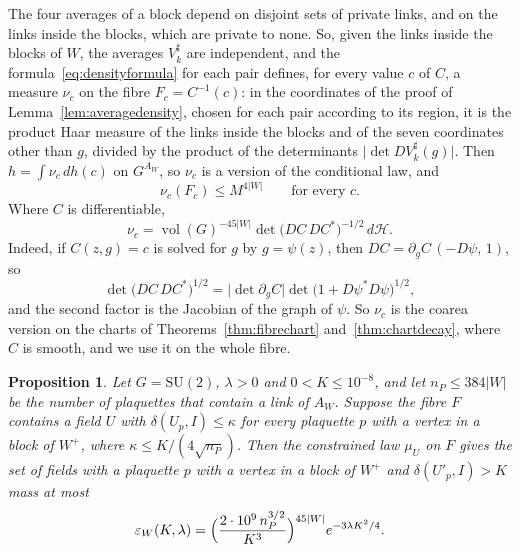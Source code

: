 \documentclass[11pt]{amsart}
\newtheorem{proposition}[theorem]{Proposition}
\theoremstyle{definition}
\theoremstyle{remark}
\numberwithin{equation}{section}
\newcommand{\SU}{\mathrm{SU}}
\begin{document}
The four averages of a block depend on disjoint sets of private links, and
on the links inside the blocks, which are private to none. So, given the
links inside the blocks of $W$, the averages $V^\sharp_k$ are independent,
and the formula~\eqref{eq:densityformula} for each pair defines, for every
value $c$ of $C$, a measure $\nu_c$ on the fibre $F_c=C^{-1}(c)$: in the
coordinates of the proof of Lemma~\ref{lem:averagedensity}, chosen for each
pair according to its region, it is the product Haar measure of the links
inside the blocks and of the seven coordinates other than $g$, divided by
the product of the determinants $\lvert\det DV^\sharp_k(g)\rvert$. Then
$h=\int\nu_c\,dh(c)$ on $G^{A_W}$, so $\nu_c$ is a version of the
conditional law, and
\begin{equation}\label{eq:fibrevolume}
\nu_c(F_c)\le M^{4|W|}\qquad\text{for every }c.
\end{equation}
Where $C$ is differentiable,
\[
\nu_c=\operatorname{vol}(G)^{-45|W|}\det\bigl(DC\,DC^*\bigr)^{-1/2}\,
d\mathcal H .
\]
Indeed, if $C(z,g)=c$ is solved for $g$ by $g=\psi(z)$, then $DC=\partial_g
C\,(-D\psi,\,1)$, so
\[
\det\bigl(DC\,DC^*\bigr)^{1/2}=\lvert\det\partial_gC\rvert\det\bigl(1+
D\psi^*D\psi\bigr)^{1/2},
\]
and the second factor is the Jacobian of the graph of $\psi$. So
$\nu_c$ is the coarea version on the charts of
Theorems~\ref{thm:fibrechart} and~\ref{thm:chartdecay}, where $C$ is smooth,
and we use it on the whole fibre.

\begin{proposition}\label{prop:calmfibre}
Let $G=\SU(2)$, $\lambda>0$ and $0<K\le10^{-8}$, and let $n_P\le384|W|$ be the
number of plaquettes that contain a link of $A_W$. Suppose the fibre $F$
contains a field $U$ with $\delta(U_p,I)\le\kappa$ for every plaquette $p$
with a vertex in a block of $W^+$, where $\kappa\le K/(4\sqrt{n_P})$. Then
the constrained law $\mu_U$ on $F$ gives the set of fields with a
plaquette $p$ with a vertex in a block of $W^+$ and $\delta(U'_p,I)>K$ mass at
most
\[
\varepsilon_W(K,\lambda)=\Bigl(\frac{2\cdot10^9\,n_P^{3/2}}{K^3}\Bigr)
^{45|W|}e^{-3\lambda K^2/4}.
\]
\end{proposition}
\end{document}
